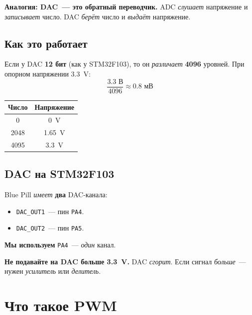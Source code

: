 \begin{keybox}
\textbf{Аналогия: DAC~--- это обратный переводчик.} ADC
\emph{слушает} напряжение и \emph{записывает} число.
DAC \emph{берёт} число и \emph{выдаёт} напряжение.
\end{keybox}

\subsection{Как это работает}

Если у DAC \textbf{12 бит} (как у STM32F103), то он
\emph{различает} \textbf{4096} уровней. При опорном
напряжении \SI{3.3}{\volt}:
\[
\frac{3.3 \text{ В}}{4096} \approx 0.8 \text{ мВ}
\]

\begin{center}
\begin{tabular}{|c|c|}
\hline
\textbf{Число} & \textbf{Напряжение} \\
\hline
\num{0} & \SI{0}{\volt} \\
\num{2048} & \SI{1.65}{\volt} \\
\num{4095} & \SI{3.3}{\volt} \\
\hline
\end{tabular}
\end{center}

\subsection{DAC на STM32F103}

Blue Pill \emph{имеет} \textbf{два} DAC-канала:
\begin{itemize}
    \item \texttt{DAC\_OUT1}~--- пин \texttt{PA4}.
    \item \texttt{DAC\_OUT2}~--- пин \texttt{PA5}.
\end{itemize}

\textbf{Мы используем} \texttt{PA4}~--- \emph{один} канал.

\begin{warnbox}
\textbf{Не подавайте на DAC больше \SI{3.3}{\volt}.}
DAC \emph{сгорит}. Если сигнал \emph{больше}~--- нужен
\emph{усилитель} или \emph{делитель}.
\end{warnbox}

\section{Что такое PWM}
\label{sec:gen-pwm}

